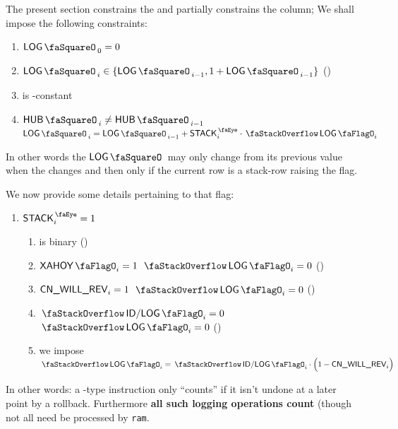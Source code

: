 The present section constrains the \logStamp{} and partially constrains the \stackLogFlag{} column;
We shall impose the following constraints:
\begin{enumerate}
	\item $\logStamp_{0} = 0$
	\item $\logStamp_{i} \in \{ \logStamp_{i - 1}, 1 + \logStamp_{i - 1} \}$ (\trash)
	\item \logStamp{} is \hubStamp{}-constant
	\item \If $\hubStamp_{i} \neq \hubStamp_{i - 1}$ \Then $\logStamp_{i} = \logStamp_{i - 1} + \peekStack_{i} \cdot \stackLogFlag_{i}$
\end{enumerate}
In other words the $\logStamp$ may only change from its previous value when the \hubStamp{} changes and then only if the current row is a stack-row raising the \stackLogFlag{} flag.

We now provide some details pertaining to that flag:
\begin{enumerate}[resume]
	\item \If $\peekStack_{i} = 1$ \Then
		\begin{enumerate}
			\item \stackLogFlag{} is binary (\trash)
			\item \If $\xAhoy_{i}           = 1$ \Then $\stackLogFlag_{i} = 0$ \quad (\trash)
			\item \If $\textsf{CN}\textsf{\_WILL\_REV}_{i}       = 1$ \Then $\stackLogFlag_{i} = 0$ \quad (\trash)
			\item \If $\stackDecLogFlag_{i} = 0$ \Then $\stackLogFlag_{i} = 0$ \quad (\trash)
			\item we impose $\stackLogFlag_{i} = \stackDecLogFlag_{i} \cdot \Big( 1 - \cnWillRev_{i} \Big)$
		\end{enumerate}
\end{enumerate}
\saNote{} 
In other words: a -type instruction only ``counts'' if it isn't undone at a later point by a rollback.
Furthermore \textbf{all such logging operations count} (though not all need be processed by \texttt{ram}.
